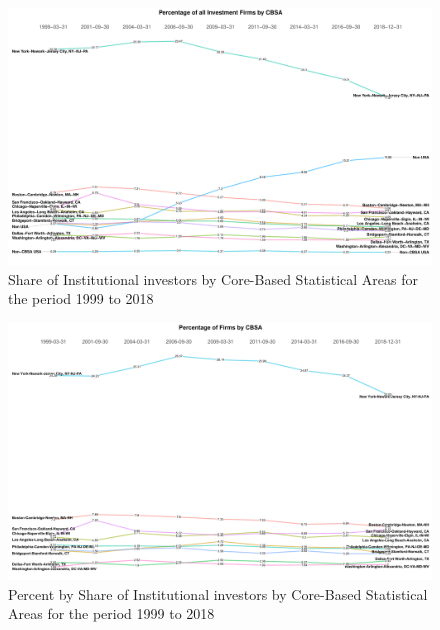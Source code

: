 \begin{figure}[h]
	\centering
	\includegraphics[width=1\linewidth]{Figures/ChapterIII/Percentage_of_Investment_Firms_by_CBSA}
	\caption[Share of Institutional Investors by CBSA]{Share of Institutional investors by Core-Based Statistical Areas for the period 1999 to 2018}
	\label{fig:percentageofinvestmentfirmsbycbsa}
\end{figure}



\begin{figure}
	\centering
	\includegraphics[width=1\linewidth]{Figures/ChapterIII/Percentage_of_Firms_by_CBSA}
	\caption[Percent by Share of Institutional Investors CBSA]{Percent by Share of Institutional investors by Core-Based Statistical Areas for the period 1999 to 2018}
	\label{fig:percentageoffirmsbycbsa}
\end{figure}



